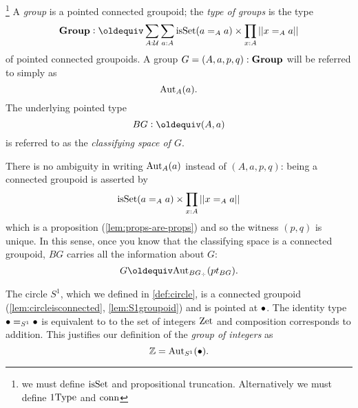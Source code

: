 \begin{definition}
\begin{definition}\label{def:typegroup}\footnote{we must define  $\mathrm{isSet}$ and propositional truncation.  Alternatively we must define $\mathrm{1Type}$ and $\mathrm{conn}$}
  A \emph{group} is a pointed connected groupoid; the \emph{type of groups} is the type 
$$\typegroup\defequi\sum_{A:\UU}\sum_{a:A}\isset(a=_Aa)\times\prod_{x:A}||x=_Aa||$$
of pointed connected groupoids.
A group $G=(A,a,p,q):\mathbf{Group}$ will be referred to simply as $$\mathrm{Aut}_A(a).$$  The underlying pointed type $$BG\defequi(A,a)$$ is referred to as the \emph{classifying space of $G$}. 
\end{definition}
\begin{remark}\label{rem:aut}
There is no ambiguity in writing $\mathrm{Aut}_A(a)$ instead of $(A,a,p,q)$: being a connected groupoid is asserted by 
$$\mathrm{isSet}(a=_Aa)\times\prod_{x:A}||x=_Aa||$$ which is a proposition  (\cref{lem:props-are-props}) and so the witness $(p,q)$  is unique.  In this sense, once you know that the classifying space is a connected groupoid, $BG$ carries all the information about $G$: $$G\oldequiv\aut_{BG_\div}(pt_{BG}).$$
\end{remark}
\end{definition}
   \begin{example}\label{excirclegroup}
   The circle $S^1$, which we defined in \cref{def:circle}, is a connected groupoid (\cref{lem:circleisconnected}, \cref{lem:S1groupoid}) and is pointed at $\bullet$. The identity type $\bullet=_{S^1}\bullet$ is equivalent to to the set of integers $\mathrm{Zet}$ and composition corresponds to addition.  This justifies our definition of the \emph{group of integers} as 
$$\mathbb{Z}=\mathrm{Aut}_{S^1}(\bullet).$$
 \end{example}

